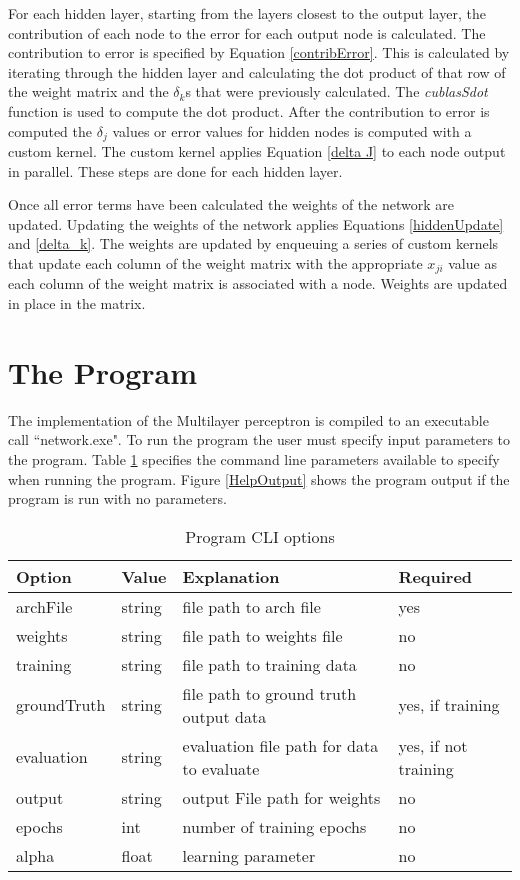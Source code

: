 \documentclass[jair, twoside,11pt,theapa]{article}
\begin{document}
For each hidden layer, starting from the layers closest to the output layer, the contribution of each node to the error for each output node is calculated.
The contribution to error is specified by Equation \ref{contribError}. 
This is calculated by iterating through the hidden layer and calculating the dot product of that row of the weight matrix and the $\delta_k$s that were previously calculated. 
The \textit{cublasSdot} function is used to compute the dot product. 
After the contribution to error is computed the $\delta_j$ values or error values for hidden nodes is computed with a custom kernel. 
The custom kernel applies Equation \ref{delta J} to each node output in parallel. 
These steps are done for each hidden layer. 

Once all error terms have been calculated the weights of the network are updated. 
Updating the weights of the network applies Equations \ref{hiddenUpdate} and \ref{delta_k}. 
The weights are updated by enqueuing a series of custom kernels that update each column of the weight matrix with the appropriate $x_{ji}$ value as each column of the weight matrix is associated with a node. 
Weights are updated in place in the matrix. 


\section{The Program}
The implementation of the Multilayer perceptron is compiled to an executable call ``network.exe". 
To run the program the user must specify input parameters to the program. 
Table \ref{ProgramOptions} specifies the command line parameters available to specify when running the program. 
Figure \ref{HelpOutput} shows the program output if the program is run with no parameters. 

\begin{table}
\centering
\caption{Program CLI options}
\label{ProgramOptions}
\begin{tabular}{|l|l|l|l|}
\hline
Option & Value & Explanation & Required \\ \hline
archFile    & string & file path to arch file & yes \\ \hline
weights    & string & \small{file path to weights file} & no \\ \hline
training    & string & file path to training data & no \\ \hline
groundTruth    & string & file path to ground truth output data  & yes, if training \\ \hline
evaluation    & string &evaluation file path for data to evaluate & yes, if not training \\ \hline
output    & string & output File path for weights & no\\ \hline
epochs    & int & number of training epochs & no\\ \hline
alpha    & float & learning parameter & no\\ \hline
\end{tabular}
\end{table}
\end{document}
